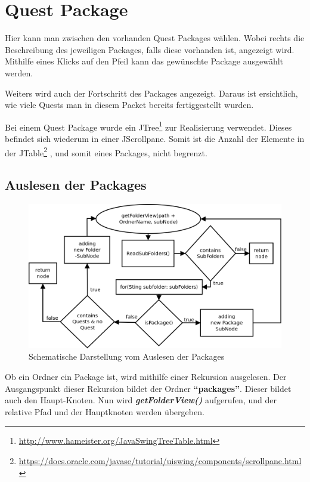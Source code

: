 \section{Quest Package}
Hier kann man zwischen den vorhanden Quest Packages wählen. Wobei rechts die Beschreibung des jeweiligen Packages, falls diese vorhanden ist, angezeigt wird. Mithilfe eines Klicks auf den Pfeil kann das gewünschte Package ausgewählt werden.

Weiters wird auch der Fortschritt des Packages angezeigt. Daraus ist ersichtlich, wie viele Quests man in diesem Packet bereits fertiggestellt wurden.

Bei einem Quest Package wurde ein JTree\footnote{\url{http://www.hameister.org/JavaSwingTreeTable.html}}  zur Realisierung verwendet. Dieses befindet sich wiederum in einer JScrollpane. Somit ist die Anzahl der Elemente in der JTable\footnote{\url{https://docs.oracle.com/javase/tutorial/uiswing/components/scrollpane.html}}  , und somit eines Packages, nicht begrenzt.

\subsection{Auslesen der Packages}
\begin{figure}[h] 
  \centering
     \includegraphics[width=1\textwidth]{./media/images/gui/package-tree-rekursion.png}
  \caption{Schematische Darstellung vom Auslesen der Packages}
  \label{fig:Package_Tree_Rekursion}
\end{figure}


Ob ein Ordner ein Package ist, wird mithilfe einer Rekursion ausgelesen. Der Ausgangspunkt dieser Rekursion bildet der Ordner \textbf{"`packages"'}. Dieser bildet auch den Haupt-Knoten. Nun wird \textit{\textbf{getFolderView()}} aufgerufen, und der relative Pfad und der Hauptknoten werden übergeben.

